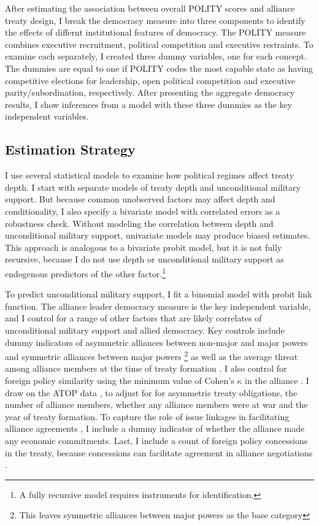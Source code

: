 \documentclass[12pt]{article}
\begin{document}
After estimating the association between overall POLITY scores and alliance treaty design, I break the democracy measure into three components to identify the effects of differnt institutional features of democracy.  
The POLITY measure combines executive recruitment, political competition and executive restraints. 
To examine each separately, I created three dummy variables, one for each concept. 
The dummies are equal to one if POLITY codes the most capable state as having competitive elections for leadership, open political competition and executive parity/subordination, respectively. 
After presenting the aggregate democracy results, I show inferences from a model with these three dummies as the key independent variables.



\subsection{Estimation Strategy}



I use several statistical models to examine how political regimes affect treaty depth. 
I start with separate models of treaty depth and unconditional military support. 
But because common unobserved factors may affect depth and conditionality, I also specify a bivariate model with correlated errors as a robustness check. 
Without modeling the correlation between depth and unconditional military support, univariate models may produce biased estimates. 
This approach is analogous to a bivariate probit model, but it is not fully recursive, because I do not use depth or unconditional military support as endogenous predictors of the other factor.\footnote{A fully recursive model requires instruments for identification.}  


To predict unconditional military support, I fit a binomial model with probit link function. 
The alliance leader democracy measure is the key independent variable, and I control for a range of other factors that are likely correlates of unconditional military support and allied democracy. 
Key controls include dummy indicators of asymmetric alliances between non-major and major powers and symmetric alliances between major powers \citep{Mattes2012}\footnote{This leaves symmetric alliances between major powers as the base category} as well as the average threat among alliance members at the time of treaty formation \citep{LeedsSavun2007}. 
I also control for foreign policy similarity using the minimum value of Cohen's $\kappa$ in the alliance \citep{Hage2011}.
I draw on the ATOP data \citep{Leedsetal2002}, to adjust for for asymmetric treaty obligations, the number of alliance members, whether any alliance members were at war and the year of treaty formation. 
To capture the role of issue linkages in facilitating alliance agreements \citep{Poast2012, Poast2013}, I include a dummy indicator of whether the alliance made any economic commitments.  
Last, I include a count of foreign policy concessions in the treaty, because concessions can facilitate agreement in alliance negotiations \citep{Johnson2015}. 
\end{document}
